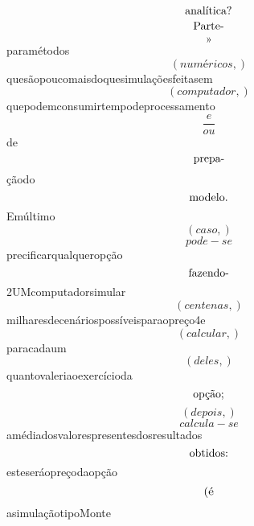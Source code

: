 \documentclass{article}
\begin{document}
\begin{equation}
$analítica?$
\end{equation}\begin{equation}
$Parte-$
\end{equation}\begin{equation}
»
\end{equation}paramétodos\begin{equation}
\left( numéricos,\right)
\end{equation}quesãopoucomaisdoquesimulaçõesfeitasem\begin{equation}
\left( computador,\right)
\end{equation}quepodemconsumirtempodeprocessamento\begin{equation}
\frac{e}{ou}
\end{equation}de\begin{equation}
$prepa-$
\end{equation}çãodo\begin{equation}
$modelo.$
\end{equation}Emúltimo\begin{equation}
\left( caso,\right)
\end{equation}\begin{equation}
pode - se
\end{equation}precificarqualqueropção\begin{equation}
$fazendo-$
\end{equation}2UMcomputadorsimular\begin{equation}
\left( centenas,\right)
\end{equation}milharesdecenáriospossíveisparaopreço4e\begin{equation}
\left( calcular,\right)
\end{equation}paracadaum\begin{equation}
\left( deles,\right)
\end{equation}quantovaleriaoexercícioda\begin{equation}
$opção;$
\end{equation}\begin{equation}
\left( depois,\right)
\end{equation}\begin{equation}
calcula - se
\end{equation}amédiadosvalorespresentesdosresultados\begin{equation}
$obtidos:$
\end{equation}esteseráopreçodaopção\begin{equation}
$(é$
\end{equation}asimulaçãotipoMonte\begin{equation}

\end{equation}
\end{document}
